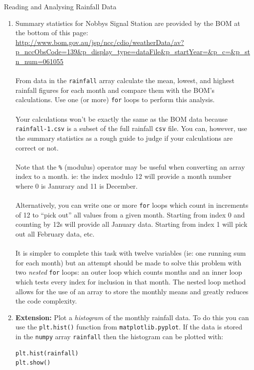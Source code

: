 \documentclass{lab}
\begin{document}
\begin{task}{Reading and Analysing Rainfall Data}{}
\begin{enumerate}
\item Summary statistics for Nobbys Signal Station are provided by the BOM at the bottom of this page: \url{http://www.bom.gov.au/jsp/ncc/cdio/weatherData/av?p_nccObsCode=139&p_display_type=dataFile&p_startYear=&p_c=&p_stn_num=061055}
\\~\\
From data in the \texttt{rainfall} array calculate the mean, lowest, and highest rainfall figures for each month and compare them with the BOM's calculations. Use one (or more) \texttt{for} loops to perform this analysis.
\\~\\
Your calculations won't be exactly the same as the BOM data because \texttt{rainfall-1.csv} is a subset of the full rainfall \texttt{csv} file. You can, however, use the summary statistics as a rough guide to judge if your calculations are correct or not.
\\~\\
Note that the \texttt{\%} (modulus) operator may be useful when converting an array index to a month. ie: the index modulo 12 will provide a month number where 0 is Janurary and 11 is December.
\\~\\
Alternatively, you can write one or more \texttt{for} loops which count in increments of 12 to ``pick out'' all values from a given month. Starting from index 0 and counting by 12s will provide all January data. Starting from index 1 will pick out all February data, etc.
\\~\\
It is simpler to complete this task with twelve variables (ie: one running sum for each month) but an attempt should be made to solve this problem with two \textit{nested} \texttt{for} loops: an outer loop which counts months and an inner loop which tests every index for inclusion in that month. The nested loop method allows for the use of an array to store the monthly means and greatly reduces the code complexity.

\item \textbf{Extension:} Plot a \textit{histogram} of the monthly rainfall data. To do this you can use the \texttt{plt.hist()} function from \texttt{matplotlib.pyplot}. If the data is stored in the \texttt{numpy} array \texttt{rainfall} then the histogram can be plotted with:

\begin{lstlisting}
plt.hist(rainfall)
plt.show()
\end{lstlisting}

\end{enumerate}
\end{task}
\end{document}
